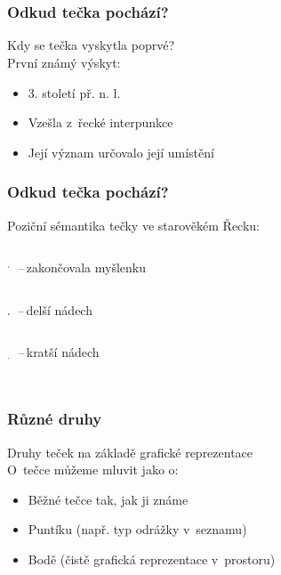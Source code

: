 \documentclass{beamer}
\begin{document}
    \section[Odkud pochází]{}
    \begin{frame}
        \frametitle{Odkud tečka pochází?}
        Kdy se tečka vyskytla poprvé?\\
        \vspace{1cm}
        \pause
        \alert{První známý výskyt:}\\
        \begin{itemize}
            \item<3->3. století př. n. l.
            \item<4->Vzešla z~řecké interpunkce
            \item<5->Její význam určovalo její umístění
        \end{itemize}
        
    \end{frame}
    \begin{frame}
        \frametitle{Odkud tečka pochází?}
        Poziční sémantika tečky ve starověkém Řecku:\\
        \vspace{5mm}
        \begin{columns}
            {\fontsize{7mm}{1cm}\selectfont $^\ldotp$}
            \,--\,zakončovala myšlenku
        \end{columns}\vspace{2mm}
        \begin{columns}
            {\fontsize{5mm}{1cm}\selectfont $\ldotp$}
            \,--\,delší nádech
        \end{columns}\vspace{2mm}
        \begin{columns}
            {\fontsize{7mm}{1cm}\selectfont $_\ldotp$}
            \,--\,kratší nádech
        \end{columns}
    \end{frame}
    \section[Různé druhy]{}
    \begin{frame}
        \frametitle{Různé druhy }
        Druhy teček na základě grafické reprezentace\\
        \vspace{1cm}
        \pause
        \alert{O~tečce můžeme mluvit jako o:}\\
        \begin{itemize}
            \item<3->Běžné tečce tak, jak ji známe
            \item<4->Puntíku (např. typ odrážky v~seznamu)
            \item<5->Bodě (čistě grafická reprezentace v~prostoru)
        \end{itemize}
    \end{frame}
\end{document}
